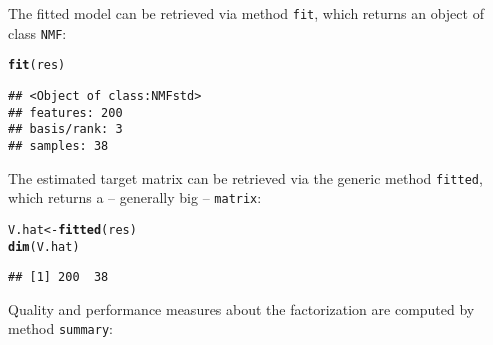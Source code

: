 \documentclass[a4paper]{article}\usepackage[]{graphicx}\usepackage[]{color}
\makeatletter
\newcommand{\hlstd}[1]{\textcolor[rgb]{0.345,0.345,0.345}{#1}}%
\newcommand{\hlkwb}[1]{\textcolor[rgb]{0.69,0.353,0.396}{#1}}%
\newcommand{\hlkwd}[1]{\textcolor[rgb]{0.737,0.353,0.396}{\textbf{#1}}}%
\newenvironment{kframe}{%
 \def\at@end@of@kframe{}%
 \ifinner\ifhmode%
  \def\at@end@of@kframe{\end{minipage}}%
  \begin{minipage}{\columnwidth}%
 \fi\fi%
 \def\FrameCommand##1{\hskip\@totalleftmargin \hskip-\fboxsep
 \colorbox{shadecolor}{##1}\hskip-\fboxsep
     \hskip-\linewidth \hskip-\@totalleftmargin \hskip\columnwidth}%
 \MakeFramed {\advance\hsize-\width
   \@totalleftmargin\z@ \linewidth\hsize
   \@setminipage}}%
 {\par\unskip\endMakeFramed%
 \at@end@of@kframe}
\newenvironment{knitrout}{}{} %
\let\code=\texttt
\makeatother
\begin{document}
The fitted model can be retrieved via method \code{fit}, which returns an object of class \code{NMF}:

\begin{knitrout}
\color{fgcolor}\begin{kframe}
\begin{alltt}
\hlkwd{fit}\hlstd{(res)}
\end{alltt}
\begin{verbatim}
## <Object of class:NMFstd>
## features: 200 
## basis/rank: 3 
## samples: 38
\end{verbatim}
\end{kframe}
\end{knitrout}

The estimated target matrix can be retrieved via the generic method \code{fitted}, which returns a -- generally big -- \code{matrix}:

\begin{knitrout}
\color{fgcolor}\begin{kframe}
\begin{alltt}
\hlstd{V.hat} \hlkwb{<-} \hlkwd{fitted}\hlstd{(res)}
\hlkwd{dim}\hlstd{(V.hat)}
\end{alltt}
\begin{verbatim}
## [1] 200  38
\end{verbatim}
\end{kframe}
\end{knitrout}

Quality and performance measures about the factorization are computed by method \code{summary}:
\end{document}
